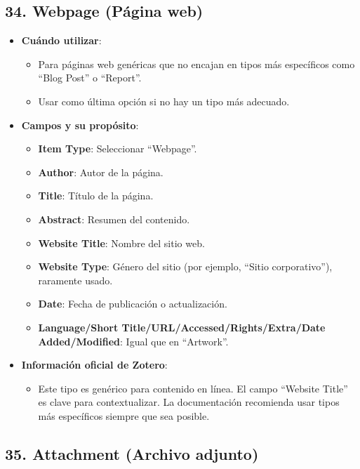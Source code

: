 \documentclass[
  jou,
  floatsintext,
  longtable,
  a4paper,
  nolmodern,
  notxfonts,
  notimes,
  colorlinks=true,linkcolor=blue,citecolor=blue,urlcolor=blue]{apa7}
\providecommand{\tightlist}{%
  \setlength{\itemsep}{0pt}\setlength{\parskip}{0pt}}
\begin{document}
\subsection{34. Webpage (Página web)}\label{webpage-puxe1gina-web}

\begin{itemize}
\tightlist
\item
  \textbf{Cuándo utilizar}:

  \begin{itemize}
  \tightlist
  \item
    Para páginas web genéricas que no encajan en tipos más específicos
    como ``Blog Post'' o ``Report''.
  \item
    Usar como última opción si no hay un tipo más adecuado.
  \end{itemize}
\item
  \textbf{Campos y su propósito}:

  \begin{itemize}
  \tightlist
  \item
    \textbf{Item Type}: Seleccionar ``Webpage''.
  \item
    \textbf{Author}: Autor de la página.
  \item
    \textbf{Title}: Título de la página.
  \item
    \textbf{Abstract}: Resumen del contenido.
  \item
    \textbf{Website Title}: Nombre del sitio web.
  \item
    \textbf{Website Type}: Género del sitio (por ejemplo, ``Sitio
    corporativo''), raramente usado.
  \item
    \textbf{Date}: Fecha de publicación o actualización.
  \item
    \textbf{Language/Short Title/URL/Accessed/Rights/Extra/Date
    Added/Modified}: Igual que en ``Artwork''.
  \end{itemize}
\item
  \textbf{Información oficial de Zotero}:

  \begin{itemize}
  \tightlist
  \item
    Este tipo es genérico para contenido en línea. El campo ``Website
    Title'' es clave para contextualizar. La documentación recomienda
    usar tipos más específicos siempre que sea posible.
  \end{itemize}
\end{itemize}

\subsection{35. Attachment (Archivo
adjunto)}\label{attachment-archivo-adjunto}
\end{document}

